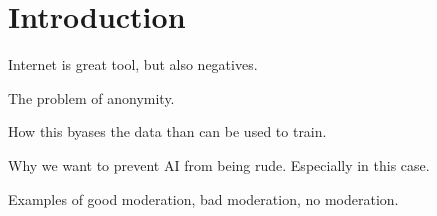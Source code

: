 \chapter{Introduction}
\label{chap:methods}

Internet is great tool, but also negatives.

The problem of anonymity.

How this byases the data than can be used to train.

Why we want to prevent AI from being rude. Especially in this case.

Examples of good moderation, bad moderation, no moderation.


